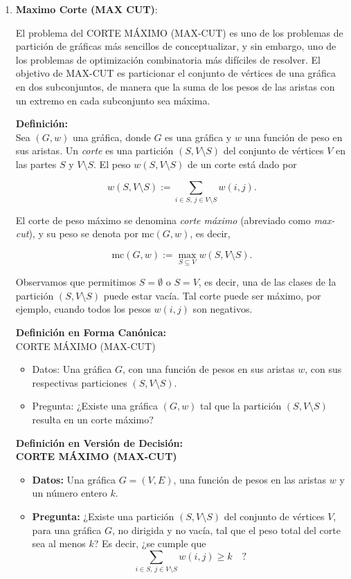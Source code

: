 \begin{enumerate}
    \item \textbf{Maximo Corte (MAX CUT)}:
    
    El problema del CORTE MÁXIMO (MAX-CUT) es uno de los problemas de partición de gráficas más sencillos de conceptualizar, y sin embargo, uno de los problemas de optimización combinatoria más difíciles de resolver. El objetivo de MAX-CUT es particionar el conjunto de vértices de una gráfica en dos subconjuntos, de manera que la suma de los pesos de las aristas con un extremo en cada subconjunto sea máxima. \cite{POLJAK1995249}

    \textbf{Definición:} \\ 
    Sea $(G, w)$ una gráfica, donde $G$ es una gráfica y $w$ una función de peso en sus aristas. Un \emph{corte} es una partición $(S, V \setminus S)$ del conjunto de vértices $V$ en las partes $S$ y $V \setminus S$. El peso $w(S, V \setminus S)$ de un corte está dado por
    
    \[
    w(S, V \setminus S) := \sum_{i \in S, \, j \in V \setminus S} w(i, j).
    \]
    
    El corte de peso máximo se denomina \emph{corte máximo} (abreviado como \emph{max-cut}), y su peso se denota por $\text{mc}(G, w)$, es decir,
    
    \[
    \text{mc}(G, w) := \max_{S \subseteq V} w(S, V \setminus S).
    \]
    
    Observamos que permitimos $S = \emptyset$ o $S = V$, es decir, una de las clases de la partición $(S, V \setminus S)$ puede estar vacía. Tal corte puede ser máximo, por ejemplo, cuando todos los pesos $w(i, j)$ son negativos.
    
    \textbf{Definición en Forma Canónica:}\\
    CORTE MÁXIMO (MAX-CUT)
    \begin{itemize}
        \item Datos: Una gráfica $G$, con una función de pesos en sus aristas $w$, con sus respectivas particiones $(S, V \setminus S)$.
        \item Pregunta: ¿Existe una gráfica $(G,w)$ tal que la partición $(S, V \setminus S)$ resulta en un corte máximo?
    \end{itemize}
    
    
    \textbf{Definición en Versión de Decisión:}\\
    \textbf{CORTE MÁXIMO (MAX-CUT)}
\begin{itemize}
    \item \textbf{Datos:} Una gráfica $G = (V, E)$, una función de pesos en las aristas $w$ y un número entero $k$.
    \item \textbf{Pregunta:} ¿Existe una partición $(S, V \setminus S)$ del conjunto de vértices $V$, para una gráfica $G$, no dirigida y no vacía, tal que el peso total del corte sea al menos $k$? Es decir, ¿se cumple que
    \[
    \sum_{i \in S, \, j \in V \setminus S} w(i, j) \ge k \quad ?
    \]
\end{itemize}
    

\end{enumerate}
